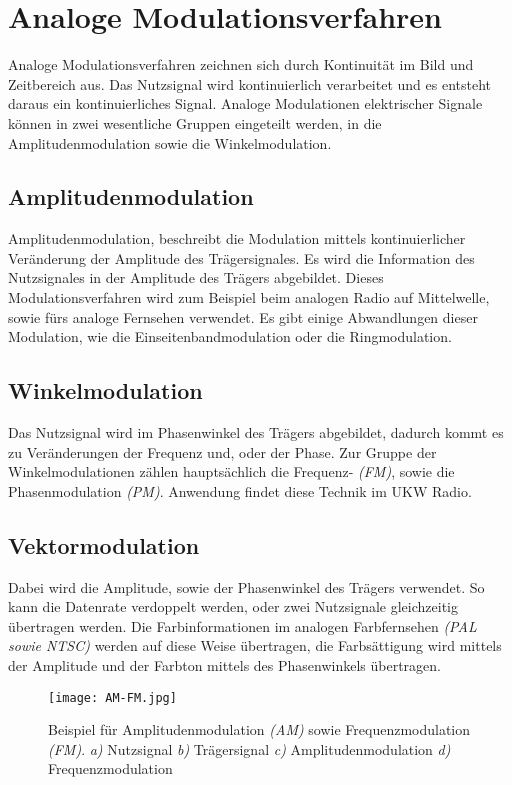 \section{Analoge Modulationsverfahren}
Analoge Modulationsverfahren zeichnen sich durch Kontinuität im Bild und Zeitbereich aus. Das Nutzsignal wird kontinuierlich verarbeitet und es entsteht daraus ein kontinuierliches Signal. Analoge Modulationen elektrischer Signale können in zwei wesentliche Gruppen eingeteilt werden, in die Amplitudenmodulation sowie die Winkelmodulation.

\subsection{Amplitudenmodulation}
Amplitudenmodulation, beschreibt die Modulation mittels kontinuierlicher Veränderung der Amplitude des Trägersignales. Es wird die Information des Nutzsignales in der Amplitude des Trägers abgebildet. Dieses Modulationsverfahren wird zum Beispiel beim analogen Radio auf Mittelwelle, sowie fürs analoge Fernsehen verwendet. Es gibt einige Abwandlungen dieser Modulation, wie die Einseitenbandmodulation oder die Ringmodulation.

\subsection{Winkelmodulation}
Das Nutzsignal wird im Phasenwinkel des Trägers abgebildet, dadurch kommt es zu Veränderungen der Frequenz und, oder der Phase. Zur Gruppe der Winkelmodulationen zählen hauptsächlich die Frequenz- \emph{(FM)}, sowie die Phasenmodulation \emph{(PM)}. Anwendung findet diese Technik im UKW Radio.

\subsection{Vektormodulation}
Dabei wird die Amplitude, sowie der Phasenwinkel des Trägers verwendet.
So kann die Datenrate verdoppelt werden, oder zwei Nutzsignale gleichzeitig übertragen werden. Die Farbinformationen im analogen Farbfernsehen \emph{(PAL sowie NTSC)} werden auf diese Weise übertragen, die Farbsättigung wird mittels der Amplitude und der Farbton mittels des Phasenwinkels übertragen.

\begin{figure}[H]
\centering
\texttt{[image: AM-FM.jpg]}
\caption{Beispiel für Amplitudenmodulation \emph{(AM)} sowie Frequenzmodulation \emph{(FM)}.
\emph{a)} Nutzsignal \emph{b)} Trägersignal \emph{c)} Amplitudenmodulation \emph{d)} Frequenzmodulation}
\label{fig:AnalogModulation}
\end{figure}

